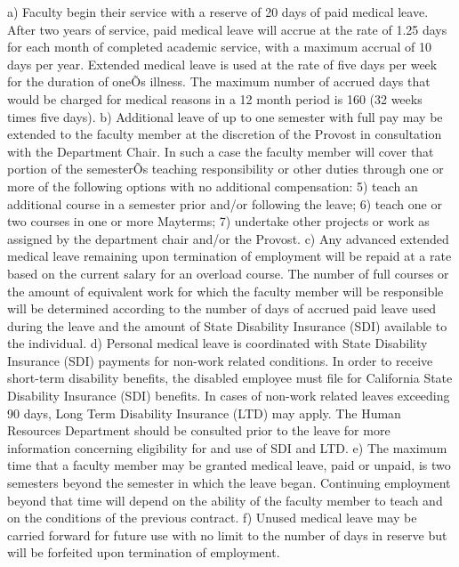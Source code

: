 \documentclass[letterpaper, 11pt]{article}
\begin{document}
	a) Faculty begin their service with a reserve of 20 days of paid medical leave.  After two years of service, paid medical leave will accrue at the rate of 1.25 days for each month of completed academic service, with a maximum accrual of 10 days per year.  Extended medical leave is used at the rate of five days per week for the duration of oneÕs illness. The maximum number of accrued days that would be charged for medical reasons in a 12 month period is 160 (32 weeks times five days).
	b) Additional leave of up to one semester with full pay may be extended to the faculty member at the discretion of the Provost in consultation with the Department Chair.  In such a case the faculty member will cover that portion of the semesterÕs teaching responsibility or other duties through one or more of the following options with no additional compensation:
	5) teach an additional course in a semester prior and/or following the leave;
	6) teach one or two courses in one or more Mayterms;
	7) undertake other projects or work as assigned by the department chair and/or the Provost.
	c) Any advanced extended medical leave remaining upon termination of employment will be repaid at a rate based on the current salary for an overload course.
	The number of full courses or the amount of equivalent work for which the faculty member will be responsible will be determined according to the number of days of accrued paid leave used during the leave and the amount of State Disability Insurance (SDI) available to the individual.
	d) Personal medical leave is coordinated with State Disability Insurance (SDI) payments for non-work related conditions. In order to receive short-term disability benefits, the disabled employee must file for California State Disability Insurance (SDI) benefits.  In cases of non-work related leaves exceeding 90 days, Long Term Disability Insurance (LTD) may apply.  The Human Resources Department should be consulted prior to the leave for more information concerning eligibility for and use of SDI and LTD.
	e) The maximum time that a faculty member may be granted medical leave, paid or unpaid, is two semesters beyond the semester in which the leave began.  Continuing employment beyond that time will depend on the ability of the faculty member to teach and on the conditions of the previous contract.
	f) Unused medical leave may be carried forward for future use with no limit to the number of days in reserve but will be forfeited upon termination of employment.
\end{document}
